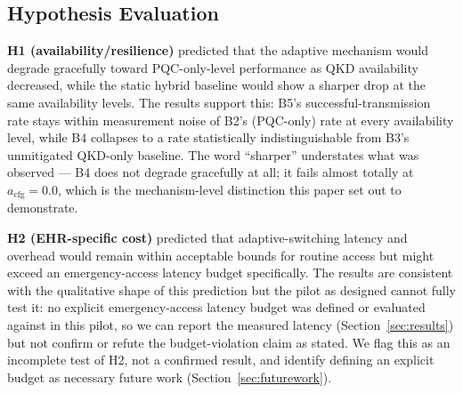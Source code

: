 \documentclass[journal]{IEEEtran}
\newcommand{\acfg}{\ensuremath{a_{\text{cfg}}}}
\begin{document}
\subsection{Hypothesis Evaluation}

\textbf{H1 (availability/resilience)} predicted that the adaptive mechanism would degrade gracefully toward PQC-only-level performance as QKD availability decreased, while the static hybrid baseline would show a sharper drop at the same availability levels. The results support this: B5's successful-transmission rate stays within measurement noise of B2's (PQC-only) rate at every availability level, while B4 collapses to a rate statistically indistinguishable from B3's unmitigated QKD-only baseline. The word ``sharper'' understates what was observed --- B4 does not degrade gracefully at all; it fails almost totally at $\acfg=0.0$, which is the mechanism-level distinction this paper set out to demonstrate.

\textbf{H2 (EHR-specific cost)} predicted that adaptive-switching latency and overhead would remain within acceptable bounds for routine access but might exceed an emergency-access latency budget specifically. The results are consistent with the qualitative shape of this prediction but the pilot as designed cannot fully test it: no explicit emergency-access latency budget was defined or evaluated against in this pilot, so we can report the measured latency (Section~\ref{sec:results}) but not confirm or refute the budget-violation claim as stated. We flag this as an incomplete test of H2, not a confirmed result, and identify defining an explicit budget as necessary future work (Section~\ref{sec:futurework}).
\end{document}
